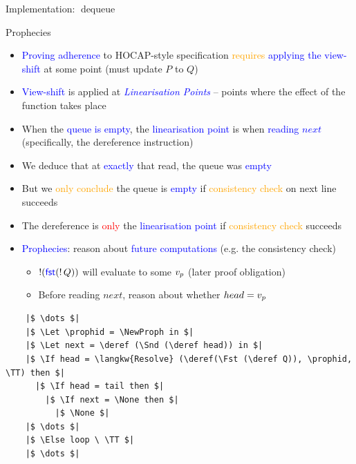 \documentclass[9pt,xcolor={dvipsnames}]{beamer}
\newcommand{\dequeue}{\operatorname{dequeue}}
\newcommand{\locN}[1]{\loc_{\mathrm{#1}}}
\newcommand{\lochead}{\locN{head}}
\newcommand{\loctail}{\locN{tail}}
\newcommand{\node}{x}
\newcommand{\prophval}{\val_p}
\begin{document}
\begin{frame}[fragile]{Implementation: $\dequeue$}
\begin{center}
{
    }
    \end{center}
\end{frame}

\begin{frame}[fragile]{Prophecies}
  \begin{itemize}
    \item \textcolor{blue}{Proving adherence} to HOCAP-style specification \textcolor{orange}{requires} \textcolor{blue}{applying the view-shift} at some point (must update \textcolor{RubineRed}{$P$} to \textcolor{RubineRed}{$Q$})
    \item<2-> \textcolor{blue}{View-shift} is applied at \textcolor{blue}{\textit{Linearisation Points}} -- points where the effect of the function takes place
    \item<3-> When the \textcolor{blue}{queue is empty}, the \textcolor{blue}{linearisation point} is when \textcolor{blue}{reading $next$} (specifically, the dereference instruction)
    \item<3-> We deduce that at \textcolor{blue}{exactly} that read, the queue was \textcolor{blue}{empty}
    \item<4-> But we \textcolor{orange}{only conclude} the queue is \textcolor{blue}{empty} if \textcolor{orange}{consistency check} on next line succeeds
    \item<4-> The dereference is \textcolor{red}{only} the \textcolor{blue}{linearisation point} if \textcolor{orange}{consistency check} succeeds
    \item<5-> \textcolor{blue}{Prophecies}: reason about \textcolor{blue}{future computations} (e.g. \textcolor{ExampleColour}{the consistency check})
      \begin{itemize}
        \item $\mathop{!}(\operatorname{\textsf{\color{blue} fst}} (\mathop{!} Q))$ will evaluate to some $\prophval$ (later proof obligation)
        \item Before reading $next$, reason about whether $head = \prophval$
      \end{itemize}
  \end{itemize}
  \vspace{-8pt}
  \begin{verbatim}
    |$ \dots $|
    |$ \Let \prophid = \NewProph in $|
    |$ \Let next = \deref (\Snd (\deref head)) in $|
    |$ \If head = \langkw{Resolve} (\deref(\Fst (\deref Q)), \prophid, \TT) then $|
      |$ \If head = tail then $|
        |$ \If next = \None then $|
          |$ \None $|
    |$ \dots $|
    |$ \Else loop \ \TT $|
    |$ \dots $|
  \end{verbatim}
\end{frame}
\end{document}
